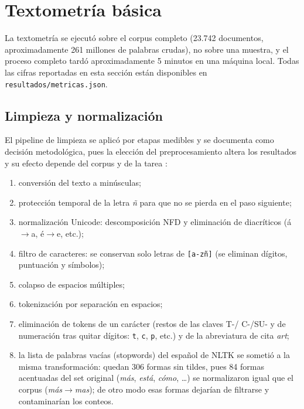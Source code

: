 \documentclass[stu,12pt,spanish,floatsintext,natbib]{apa7}
\begin{document}
\section{Textometría básica}

La textometría se ejecutó sobre el corpus completo (23.742 documentos,
aproximadamente 261 millones de palabras crudas), no sobre una muestra, y
el proceso completo tardó aproximadamente 5 minutos en una máquina local.
Todas las cifras reportadas en esta sección están disponibles en
\texttt{resultados/metricas.json}.

\subsection{Limpieza y normalización}
El pipeline de limpieza se aplicó por etapas medibles y se documenta como
decisión metodológica, pues la elección del preprocesamiento altera los
resultados y su efecto depende del corpus y de la tarea
\citep{hacohenKerner2020influence}:
\begin{enumerate}
  \item conversión del texto a minúsculas;
  \item protección temporal de la letra \emph{ñ} para que no se pierda en
    el paso siguiente;
  \item normalización Unicode: descomposición NFD y eliminación de
    diacríticos (\'a$\rightarrow$a, \'e$\rightarrow$e, etc.);
  \item filtro de caracteres: se conservan solo letras de
    \texttt{[a-z\~n]} (se eliminan dígitos, puntuación y símbolos);
  \item colapso de espacios múltiples;
  \item tokenización por separación en espacios;
  \item eliminación de tokens de un carácter (restos de las claves T-/
    C-/SU- y de numeración tras quitar dígitos: \texttt{t},
    \texttt{c}, \texttt{p}, etc.) y de la abreviatura de cita
    \emph{art};
  \item la lista de palabras vacías (stopwords) del español de NLTK se
    sometió a la misma transformación: quedan 306 formas sin tildes,
    pues 84 formas acentuadas del set original (\emph{más},
    \emph{está}, \emph{cómo}, \ldots) se normalizaron igual que el corpus
    (\emph{más}$\rightarrow$\emph{mas}); de otro modo esas formas
    dejarían de filtrarse y contaminarían los conteos.
\end{enumerate}
\end{document}
